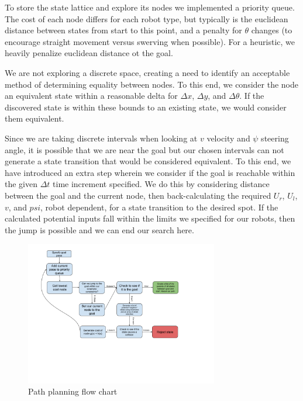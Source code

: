 \documentclass{article}
\begin{document}
To store the state lattice and explore its nodes we implemented a priority queue. The cost of each node differs for each robot type, but typically is the euclidean distance between states from start to this point, and a penalty for $\theta$ changes (to encourage straight movement versus swerving when possible). For a heuristic, we heavily penalize euclidean distance ot the goal.

We are not exploring a discrete space, creating a need to identify an acceptable method of determining equality between nodes. To this end, we consider the node an equivalent state within a reasonable delta for $\Delta x$, $\Delta y$, and $\Delta \theta$. If the discovered state is within these bounds to an existing state, we would consider them equivalent.

Since we are taking discrete intervals when looking at $v$ velocity and $\psi$ steering angle, it is possible that we are near the goal but our chosen intervals can not generate a state transition that would be considered equivalent. To this end, we have introduced an extra step wherein we consider if the goal is reachable within the given $\Delta t$ time increment specified. We do this by considering distance between the goal and the current node, then back-calculating the required $U_r$, $U_l$, $v$, and $psi$, robot dependent, for a state transition to the desired spot. If the calculated potential inputs fall within the limits we specified for our robots, then the jump is possible and we can end our search here.

\begin{figure}[H]
    \centering
    \includegraphics[width = 0.75\textwidth]{imgs/RBE550 Valet flow chart.png}
    \caption{Path planning flow chart}
    \label{fig:path-planning-flowchart}
\end{figure}
\end{document}
